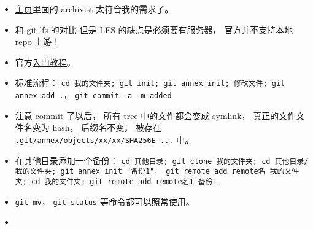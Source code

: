 
\begin{itemize}
\item \href{https://git-annex.branchable.com/}{主页}里面的 archivist 太符合我的需求了。
\item \href{https://stackoverflow.com/questions/39337586/how-do-git-lfs-and-git-annex-differ}{和 git-lfs 的对比} 但是 LFS 的缺点是必须要有服务器， 官方并不支持本地 repo 上游！
\item 官方\href{https://git-annex.branchable.com/walkthrough/}{入门教程}。
\item 标准流程： \verb|cd 我的文件夹; git init; git annex init; 修改文件; git annex add .|， \verb|git commit -a -m added|
\item 注意 commit 了以后， 所有 tree 中的文件都会变成 symlink， 真正的文件文件名变为 hash， 后缀名不变， 被存在 \verb|.git/annex/objects/xx/xx/SHA256E-...| 中。
\item 在其他目录添加一个备份： \verb|cd 其他目录; git clone 我的文件夹; cd 其他目录/我的文件夹; git annex init "备份1"， git remote add remote名 我的文件夹; cd 我的文件夹; git remote add remote名1 备份1|
\item \verb|git mv|， \verb|git status| 等命令都可以照常使用。
\item 
\end{itemize}
